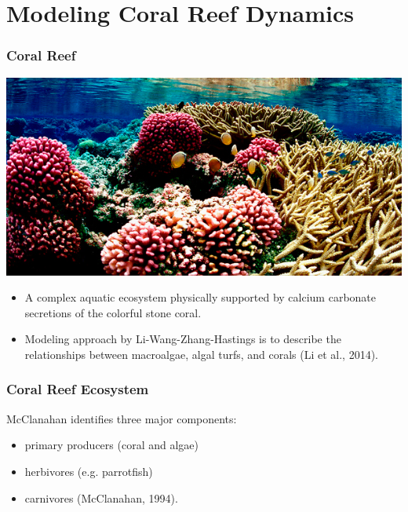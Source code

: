 \documentclass{beamer}
\begin{document}
\section{Modeling Coral Reef Dynamics}

\begin{frame}
\frametitle{Coral Reef}
\includegraphics[scale=.175]{./US-Wildlife-coral-1.jpg}
\begin{itemize}
\item A complex aquatic ecosystem physically supported by calcium carbonate secretions of the colorful stone coral. \\
\item Modeling approach by Li-Wang-Zhang-Hastings is to describe the relationships between macroalgae, algal turfs, and corals (Li et al., 2014).
\end{itemize}
\end{frame}

\begin{frame}
\frametitle{Coral Reef Ecosystem} 

McClanahan identifies three major components:
\begin{itemize}
\item primary producers (coral and algae)\\
\item herbivores (e.g. parrotfish)\\
\item carnivores (McClanahan, 1994).
\end{itemize}
\end{frame}
\end{document}
